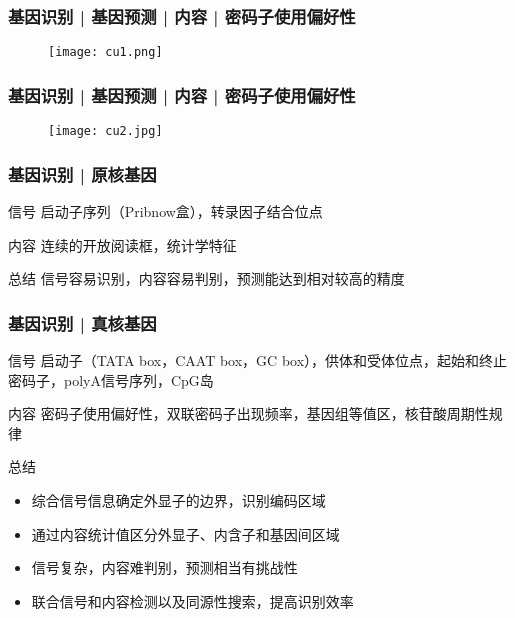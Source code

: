 \begin{frame}
  \frametitle{基因识别 | 基因预测 | 内容 | 密码子使用偏好性}
  \begin{figure}
    \centering
    \texttt{[image: cu1.png]}
  \end{figure}
\end{frame}

\begin{frame}
  \frametitle{基因识别 | 基因预测 | 内容 | 密码子使用偏好性}
  \begin{figure}
    \centering
    \texttt{[image: cu2.jpg]}
  \end{figure}
\end{frame}

\begin{frame}
  \frametitle{基因识别 | 原核基因}
  \begin{block}{信号}
    启动子序列（Pribnow盒），转录因子结合位点
  \end{block}
  \begin{block}{内容}
    连续的开放阅读框，统计学特征
  \end{block}
  \pause
  \begin{block}{总结}
    信号容易识别，内容容易判别，预测能达到相对较高的精度
  \end{block}
\end{frame}

\begin{frame}
  \frametitle{基因识别 | 真核基因}
  \begin{block}{信号}
    启动子（TATA box，CAAT box，GC box），供体和受体位点，起始和终止密码子，polyA信号序列，CpG岛
  \end{block}
  \begin{block}{内容}
    密码子使用偏好性，双联密码子出现频率，基因组等值区，核苷酸周期性规律
  \end{block}
  \pause
  \begin{block}{总结}
    \begin{itemize}
      \item 综合信号信息确定外显子的边界，识别编码区域
      \item 通过内容统计值区分外显子、内含子和基因间区域
      \item 信号复杂，内容难判别，预测相当有挑战性
      \item 联合信号和内容检测以及同源性搜索，提高识别效率
    \end{itemize}
  \end{block}
\end{frame}

